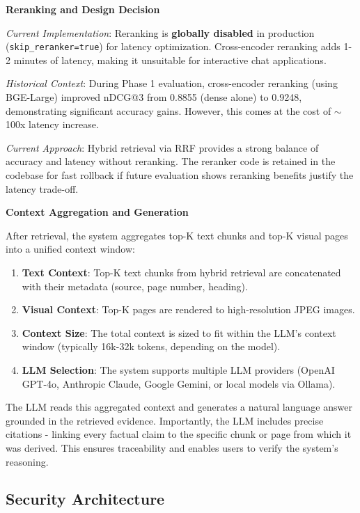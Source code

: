 \textbf{Reranking and Design Decision}

\textit{Current Implementation}: Reranking is \textbf{globally disabled} in production (\texttt{skip\_reranker=true}) for latency optimization. Cross-encoder reranking adds 1-2 minutes of latency, making it unsuitable for interactive chat applications.

\textit{Historical Context}: During Phase 1 evaluation, cross-encoder reranking (using BGE-Large) improved nDCG@3 from 0.8855 (dense alone) to 0.9248, demonstrating significant accuracy gains. However, this comes at the cost of $\sim$100x latency increase.

\textit{Current Approach}: Hybrid retrieval via RRF provides a strong balance of accuracy and latency without reranking. The reranker code is retained in the codebase for fast rollback if future evaluation shows reranking benefits justify the latency trade-off.

\textbf{Context Aggregation and Generation}

After retrieval, the system aggregates top-K text chunks and top-K visual pages into a unified context window:

\begin{enumerate}
    \item \textbf{Text Context}: Top-K text chunks from hybrid retrieval are concatenated with their metadata (source, page number, heading).
    \item \textbf{Visual Context}: Top-K pages are rendered to high-resolution JPEG images.
    \item \textbf{Context Size}: The total context is sized to fit within the LLM's context window (typically 16k-32k tokens, depending on the model).
    \item \textbf{LLM Selection}: The system supports multiple LLM providers (OpenAI GPT-4o, Anthropic Claude, Google Gemini, or local models via Ollama).
\end{enumerate}

The LLM reads this aggregated context and generates a natural language answer grounded in the retrieved evidence. Importantly, the LLM includes precise citations - linking every factual claim to the specific chunk or page from which it was derived. This ensures traceability and enables users to verify the system's reasoning.

\subsection{Security Architecture}\label{sec:security_arch}

